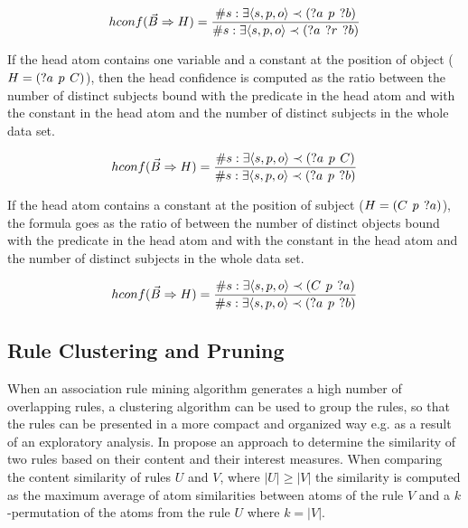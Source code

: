 $$hconf(\vec{B} \Rightarrow H) = \frac{\# s: \exists \langle s,p,o\rangle \prec (?a\hspace{0.4em}p\hspace{0.4em}?b) }{\# s: \exists \langle s,p,o\rangle \prec (?a\hspace{0.4em}?r\hspace{0.4em}?b) }$$

If the head atom contains one variable and a constant at the position of object ($H = (?a\hspace{0.4em}p\hspace{0.4em}C)$), then the head confidence is computed as the ratio between the number of distinct subjects bound with the predicate in the head atom and with the constant in the head atom and the number of distinct subjects in the whole data set.

$$hconf(\vec{B} \Rightarrow H) = \frac{\# s: \exists \langle s,p,o\rangle \prec (?a\hspace{0.4em}p\hspace{0.4em}C) }{\# s: \exists \langle s,p,o\rangle \prec (?a\hspace{0.4em}p\hspace{0.4em}?b) }$$\label{hconf2}

If the head atom contains a constant at the position of subject ($H = (C\hspace{0.4em}p\hspace{0.4em}?a)$), the formula goes as the ratio of between the number of distinct objects bound with the predicate in the head atom and with the constant in the head atom and the number of distinct subjects in the whole data set.

$$hconf(\vec{B} \Rightarrow H) = \frac{\# s: \exists \langle s,p,o\rangle \prec (C\hspace{0.4em}p\hspace{0.4em}?a) }{\# s: \exists \langle s,p,o\rangle \prec (?a\hspace{0.4em}p\hspace{0.4em}?b) }$$

\subsection{Rule Clustering and Pruning}

When an association rule mining algorithm generates a high number of overlapping rules, a clustering algorithm can be used to group the rules, so that the rules can be presented in a more compact and organized way e.g. as a result of an exploratory analysis. In \cite{Zeman2020} propose an approach to determine the similarity of two rules based on their content and their interest measures. When comparing the content similarity of rules $U$ and $V$, where $|U| \geq |V|$ the similarity is computed as the maximum average of atom similarities between atoms of the rule $V$ and a $k$-permutation of the atoms from the rule $U$ where $k = |V|$.

